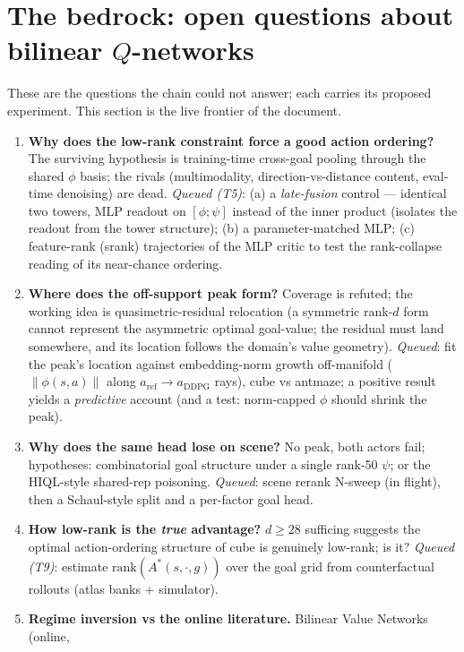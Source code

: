\documentclass[11pt]{article}
\begin{document}
\section{The bedrock: open questions about bilinear $Q$-networks}\label{sec:open}

These are the questions the chain could not answer; each carries its proposed experiment.
This section is the live frontier of the document.

\begin{enumerate}[leftmargin=1.6em,itemsep=3pt]
\item \textbf{Why does the low-rank constraint force a good action ordering?} The surviving
hypothesis is training-time cross-goal pooling through the shared $\phi$ basis; the rivals
(multimodality, direction-vs-distance content, eval-time denoising) are dead. \emph{Queued
(T5)}: (a) a \emph{late-fusion} control --- identical two towers, MLP readout on
$[\phi;\psi]$ instead of the inner product (isolates the readout from the tower structure);
(b) a parameter-matched MLP; (c) feature-rank (srank) trajectories of the MLP critic to test
the rank-collapse reading of its near-chance ordering.
\item \textbf{Where does the off-support peak form?} Coverage is refuted; the working idea
is quasimetric-residual relocation (a symmetric rank-$d$ form cannot represent the
asymmetric optimal goal-value; the residual must land somewhere, and its location follows
the domain's value geometry). \emph{Queued}: fit the peak's location against embedding-norm
growth off-manifold ($\|\phi(s,a)\|$ along $a_{\mathrm{ref}}\to a_{\mathrm{DDPG}}$ rays),
cube vs antmaze; a positive result yields a \emph{predictive} account (and a test:
norm-capped $\phi$ should shrink the peak).
\item \textbf{Why does the same head lose on scene?} No peak, both actors fail; hypotheses:
combinatorial goal structure under a single rank-50 $\psi$; or the HIQL-style shared-rep
poisoning. \emph{Queued}: scene rerank N-sweep (in flight), then a Schaul-style split and a
per-factor goal head.
\item \textbf{How low-rank is the \emph{true} advantage?} $d\ge28$ sufficing suggests the
optimal action-ordering structure of cube is genuinely low-rank; is it? \emph{Queued (T9)}:
estimate $\mathrm{rank}(A^*(s,\cdot,g))$ over the goal grid from counterfactual rollouts
(atlas banks + simulator).
\item \textbf{Regime inversion vs the online literature.} Bilinear Value Networks (online,

\end{enumerate}
\end{document}

